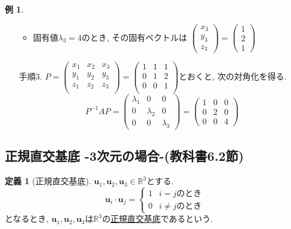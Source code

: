 \documentclass[dvipdfmx,a4paper,11pt]{article}
\newcommand{\R}{\mathbb{R}}
\theoremstyle{definition}
\newtheorem{dfn}[thm]{定義}
\newtheorem{exa}[thm]{例}
\begin{document}
\begin{exa}
\begin{enumerate}
\begin{itemize}
  \item 固有値$\lambda_3=4$のとき, その固有ベクトルは
 $ \begin{pmatrix}
x_3\\  y_3\\ z_3
 \end{pmatrix}  
 =
  \begin{pmatrix}
1\\  2\\1
 \end{pmatrix}  
 $
 \end{itemize}
\item[手順3.]  
$P=\begin{pmatrix}
x_1&x_2&x_3\\  
y_1&y_2&y_3\\ 
z_1&z_2&z_3\\
\end{pmatrix}
=
\begin{pmatrix}
1& 1&1 \\
0&1&2 \\
0&0& 1 \\
\end{pmatrix}
$とおくと, 次の対角化を得る.
$$
P^{-1} A P=
\begin{pmatrix}
\lambda_1& 0 &0\\
0& \lambda_2 &0\\
0 & 0& \lambda_3
\end{pmatrix}
=
\begin{pmatrix}
1& 0 &0\\
0& 2 &0\\
0 & 0& 4
\end{pmatrix}
$$ 
\end{enumerate}
\end{exa}



 \subsection{正規直交基底 -3次元の場合-(教科書6.2節)}
 
   \begin{tcolorbox}[
    colback = white,
    colframe = green!35!black,
    fonttitle = \bfseries,
    breakable = true]
    \begin{dfn}[正規直交基底]
$\bm{u}_1, \bm{u}_2, \bm{u}_3\in \R^3$とする. 
$$
\bm{u}_i\cdot \bm{u}_j =
\left\{
\begin{array}{ll}
1 & \text{$i=j$のとき} \\
0 & \text{$i\neq j$のとき}
\end{array}
\right.
$$
となるとき, $\bm{u}_1, \bm{u}_2, \bm{u}_3$は$\R^3$の\underline{正規直交基底}であるという. 
  \end{dfn}
 \end{tcolorbox}
\end{document}
